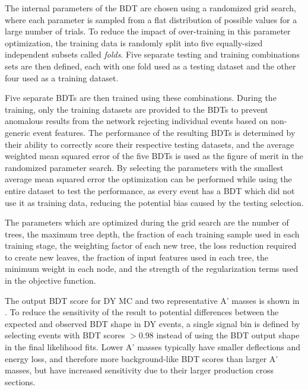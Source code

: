The internal parameters of the BDT are chosen using a randomized grid search, where each parameter is sampled from a flat distribution of possible values for a large number of trials.
To reduce the impact of over-training in this parameter optimization, the training data is randomly split into five equally-sized independent subsets called \emph{folds}.
Five separate testing and training combinations sets are then defined, each with one fold used as a testing dataset and the other four used as a training dataset.

Five separate BDTs are then trained using these combinations.
During the training, only the training datasets are provided to the BDTs to prevent anomalous results from the network rejecting individual events based on non-generic event features.
The performance of the resulting BDTs is determined by their ability to correctly score their respective testing datasets, and the average weighted mean squared error of the five BDTs is used as the figure of merit in the randomized parameter search.
By selecting the parameters with the smallest average mean squared error the optimization can be performed while using the entire dataset to test the performance, as every event has a BDT which did not use it as training data, reducing the potential bias caused by the testing selection.

The parameters which are optimized during the grid search are the number of trees, the maximum tree depth, the fraction of each training sample used in each training stage, the weighting factor of each new tree, the loss reduction required to create new leaves, the fraction of input features used in each tree, the minimum weight in each node, and the strength of the regularization terms used in the objective function.

The output BDT score for DY MC and two representative A' masses is shown in . 
To reduce the sensitivity of the result to potential differences between the expected and observed BDT shape in DY events, a single signal bin is defined by selecting events with BDT scores $>$0.98 instead of using the BDT output shape in the final likelihood fits.
Lower A' masses typically have smaller deflections and energy loss, and therefore more background-like BDT scores than larger A' masses, but have increased sensitivity due to their larger \dbrem production cross sections.

